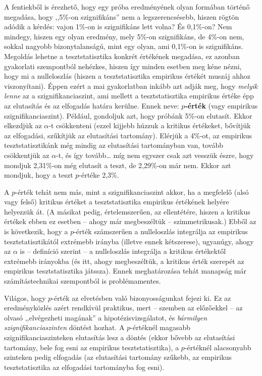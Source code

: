 \documentclass[]{book}
\begin{document}
A fentiekből is érezhető, hogy egy próba eredményének olyan formában
történő megadása, hogy ,,5\%-on szignifikáns'' nem a legszerencsésebb,
hiszen rögtön adódik a kérdés: vajon 1\%-on is szignifikáns lett volna?
És 0,1\%-on? Nem mindegy, hiszen egy olyan eredmény, mely 5\%-on
szignifikáns, de 4\%-on nem, sokkal nagyobb bizonytalanságú, mint egy
olyan, ami 0,1\%-on is szignifikáns. Megoldás lehetne a tesztstatisztika
konkrét értékének megadása, ez azonban gyakorlati szempontból nehézkes,
hiszen így minden esetben meg kéne nézni, hogy mi a nulleloszlás (hiszen
a tesztstatisztika empirikus értékét muszáj ahhoz viszonyítani). Éppen
ezért a mai gyakorlatban inkább azt adják meg, hogy \emph{melyik lenne}
az a szignifikanciaszint, ami mellett a tesztstatisztika empirikus
értéke épp az elutasítás és az elfogadás határa kerülne. Ennek neve:
\textbf{\(p\)-érték} (vagy empirikus szignifikanciaszint). Például,
gondoljuk azt, hogy próbánk 5\%-on elutasít. Ekkor elkezdjük az
\(\alpha\)-t csökkenteni (ezzel kijjebb húzzuk a kritikus értékeket,
bővítjük az elfogadási, szűkítjük az elutasítási tartomány). Elérjük a
4\%-ot, az empirikus tesztstatisztikánk még mindig az elutasítási
tartományban van, tovább csökkentjük az \(\alpha\)-t, és így
tovább\dots{} míg nem egyszer csak azt vesszük észre, hogy mondjuk
2,31\%-on még elutasít a teszt, de 2,29\%-on már nem. Ekkor azt mondjuk,
hogy a teszt \(p\)-értéke 2,3\%.

A \(p\)-érték tehát nem más, mint a szignifikanciaszint akkor, ha a
megfelelő (alsó vagy felső) kritikus értéket a tesztstatisztika
empirikus értékének helyére helyezzük át. (A másikat pedig,
értelemszerűen, az ellentétére, hiszen a kritikus értékek ebben ez
esetben -- ahogy már megbeszéltük -- szimmetrikusak.) Ebből az is
következik, hogy a \(p\)-érték számszerűen a nulleloszlás integrálja az
empirikus tesztstatisztikától extrémebb irányba (illetve ennek
kétszerese), ugyanúgy, ahogy az \(\alpha\) is -- definíció szerint -- a
nulleloszlás integrálja a kritikus értékektől extrémebb irányokba (és
itt, ahogy megbeszéltük, a kritikus érték szerepét az empirikus
tesztstatisztika játssza). Ennek meghatározása tehát manapság már
számítástechnikai szempontból is problémamentes.

Világos, hogy \(p\)-érték az elvetésben való bizonyosságunkat fejezi ki.
Ez az eredményközlés azért rendkívül praktikus, mert -- szemben az
előzőekkel -- az olvasó ,,elvégezheti magának'' a hipotézisvizsgálatot,
és \emph{bármilyen szignifikanciaszinten} döntést hozhat. A
\(p\)-értéknél magasabb szignifikanciaszinteken elutasítás lesz a döntés
(ekkor bővebb az elutasítási tartomány, bele fog esni az empirikus
tesztstatisztika), a \(p\)-értéknél alacsonyabb szinteken pedig
elfogadás (az elutasítási tartomány szűkebb, az empirikus
tesztstatisztika az elfogadási tartományba fog esni).
\end{document}
